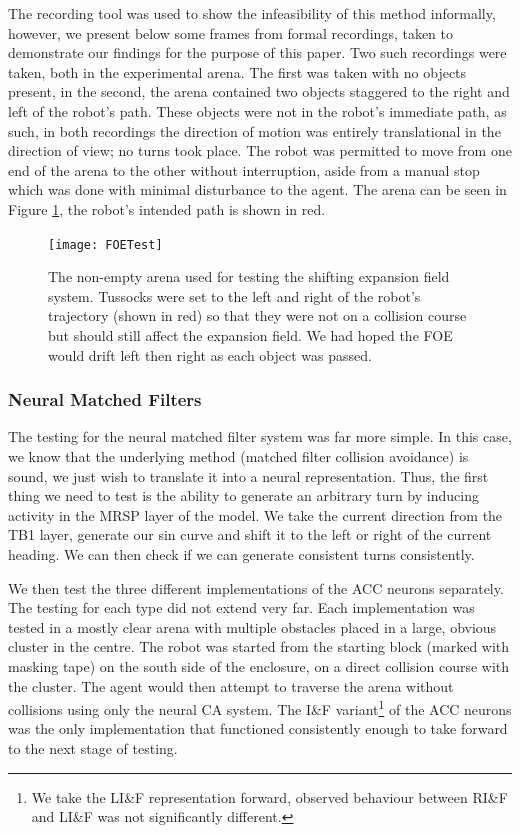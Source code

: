 \documentclass[a4paper,11pt,twoside,openright]{article}
\begin{document}
The recording tool was used to show the infeasibility of this method informally,
however, we present below some frames from formal recordings, taken to
demonstrate our findings for the purpose of this paper. Two such recordings were
taken, both in the experimental arena. The first was taken with no objects
present, in the second, the arena contained two objects staggered to the right
and left of the robot's path. These objects were not in the robot's immediate
path, as such, in both recordings the direction of motion was entirely
translational in the direction of view; no turns took place. The robot was
permitted to move from one end of the arena to the other without interruption,
aside from a manual stop which was done with minimal disturbance to
the agent. The arena can be seen in Figure \ref{fig:foetest}, the
robot's intended path is shown in red.

\begin{figure}[h!]
  \centering
  \texttt{[image: FOETest]}
  \caption{\label{fig:foetest}
    The non-empty arena used for testing the shifting expansion field
    system. Tussocks were set to the left and right of the robot's
    trajectory (shown in red) so that they were not on a collision
    course but should still affect the expansion field. We had hoped
    the FOE would drift left then right as each object was passed.
  }
\end{figure}

\subsubsection{Neural Matched Filters}
The testing for the neural matched filter system was far more
simple. In this case, we know that the underlying method (matched
filter collision avoidance) is sound, we just wish to translate it
into a neural representation. Thus, the first thing we need to test is
the ability to generate an arbitrary turn by inducing activity in the
MRSP layer of the model. We take the current direction from the TB1
layer, generate our sin curve and shift it to the left or right of the
current heading. We can then check if we can generate consistent turns
consistently.
\newline
\par

We then test the three different implementations of the ACC neurons
separately. The testing for each type did not extend very far. Each
implementation was tested in a mostly clear arena with multiple
obstacles placed in a large, obvious cluster in the centre. The robot
was started from the starting block (marked with masking tape) on the
south side of the enclosure, on a direct collision course with the
cluster. The agent would then attempt to traverse the arena without
collisions using only the neural CA system. The I\&F
variant\footnote{We take the LI\&F representation forward, observed
  behaviour between RI\&F and LI\&F was not significantly different.}
of the ACC neurons was the only implementation that functioned
consistently enough to take forward to the next stage of testing.
\newline\par
\end{document}
